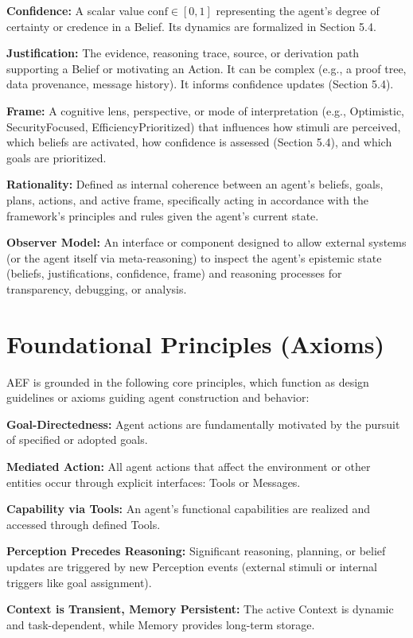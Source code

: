 \documentclass[10pt,a4paper]{article}
\begin{document}
\textbf{Confidence:} A scalar value $\mathrm{conf} \in [0,1]$ representing the agent's degree of certainty or credence in a Belief. Its dynamics are formalized in Section 5.4.

\textbf{Justification:} The evidence, reasoning trace, source, or derivation path supporting a Belief or motivating an Action. It can be complex (e.g., a proof tree, data provenance, message history). It informs confidence updates (Section 5.4).

\textbf{Frame:} A cognitive lens, perspective, or mode of interpretation (e.g., Optimistic, SecurityFocused, EfficiencyPrioritized) that influences how stimuli are perceived, which beliefs are activated, how confidence is assessed (Section 5.4), and which goals are prioritized.

\textbf{Rationality:} Defined as internal coherence between an agent's beliefs, goals, plans, actions, and active frame, specifically acting in accordance with the framework's principles and rules given the agent's current state.

\textbf{Observer Model:} An interface or component designed to allow external systems (or the agent itself via meta-reasoning) to inspect the agent's epistemic state (beliefs, justifications, confidence, frame) and reasoning processes for transparency, debugging, or analysis.

\section{Foundational Principles (Axioms)}
AEF is grounded in the following core principles, which function as design guidelines or axioms guiding agent construction and behavior:

\textbf{Goal-Directedness:} Agent actions are fundamentally motivated by the pursuit of specified or adopted goals.

\textbf{Mediated Action:} All agent actions that affect the environment or other entities occur through explicit interfaces: Tools or Messages.

\textbf{Capability via Tools:} An agent's functional capabilities are realized and accessed through defined Tools.

\textbf{Perception Precedes Reasoning:} Significant reasoning, planning, or belief updates are triggered by new Perception events (external stimuli or internal triggers like goal assignment).

\textbf{Context is Transient, Memory Persistent:} The active Context is dynamic and task-dependent, while Memory provides long-term storage.
\end{document}

